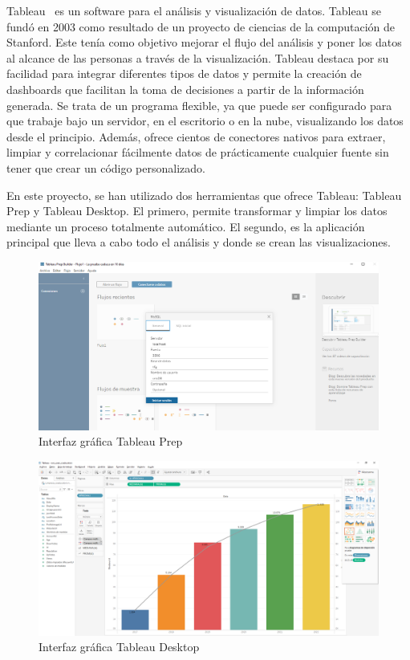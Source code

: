 \documentclass[a4paper, 12pt]{book}
\begin{document}
Tableau~\cite{Tableau} es un software para el análisis y visualización de datos. Tableau se fundó en 2003 como resultado de un proyecto de ciencias de la computación de Stanford. Este tenía como objetivo mejorar el flujo del análisis y poner los datos al alcance de las personas a través de la visualización.  
Tableau destaca por su facilidad para integrar diferentes tipos de datos y permite la creación de dashboards que facilitan  la toma de decisiones a partir de la información generada. Se trata de un programa flexible, ya que puede ser configurado para que trabaje bajo un servidor, en el escritorio o en la nube, visualizando los datos desde el principio. Además, ofrece cientos de conectores nativos para extraer, limpiar y correlacionar fácilmente datos de prácticamente cualquier fuente sin tener que crear un código personalizado.

En este proyecto, se han utilizado dos herramientas que ofrece Tableau: Tableau Prep y Tableau Desktop. El primero, permite transformar y limpiar los datos mediante un proceso totalmente automático. El segundo, es la aplicación principal que lleva a cabo todo el análisis y donde se crean las visualizaciones. 
\begin{figure}[H]
        \includegraphics[width=\textwidth]{img/PREP.png}
        \caption{Interfaz gráfica Tableau Prep}
        \label{figura:Grafana}
    \end{figure}
    \begin{figure}[H]
        \includegraphics[width=\textwidth]{img/Desktop.png}
        \caption{Interfaz gráfica Tableau Desktop}
        \label{figura:Grafana}
    \end{figure}
\end{document}

